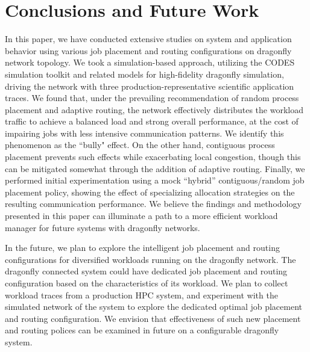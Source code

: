 \section{Conclusions and Future Work}
\label{sec:conclusion}

In this paper, we have conducted extensive studies on system and application behavior using various job placement and routing configurations on dragonfly network topology. We took a simulation-based approach, utilizing the CODES simulation toolkit and related models for high-fidelity dragonfly simulation, driving the network with three production-representative scientific application traces. We found that, under the prevailing recommendation of random process placement and adaptive routing, the network effectively distributes the workload traffic to achieve a balanced load and strong overall performance, at the cost of impairing jobs with less intensive communication patterns. We identify this phenomenon as the ``bully" effect. On the other hand, contiguous process placement prevents such effects while exacerbating local congestion, though this can be mitigated somewhat through the addition of adaptive routing. Finally, we performed initial experimentation using a mock ``hybrid'' contiguous/random job placement policy, showing the effect of specializing allocation strategies on the resulting communication performance.
We believe the findings and methodology presented in this paper can illuminate a path to a more efficient workload manager for future systems with dragonfly networks. 

In the future, we plan to explore the intelligent job placement and routing configurations for diversified workloads running on the dragonfly network. The dragonfly connected system could have dedicated job placement and routing configuration based on the characteristics of its workload. We plan to collect workload traces from a production HPC system, and experiment with the simulated network of the system to explore the dedicated optimal job placement and routing configuration. We envision that effectiveness of such new placement and routing polices can be examined in future on a configurable dragonfly system. 

